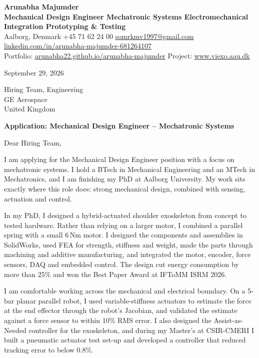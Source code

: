 \documentclass[10pt,a4paper]{article}
\begin{document}
{\LARGE\bfseries Arunabha Majumder}\\[2pt]
\textbf{Mechanical Design Engineer \textbar{} Mechatronic Systems \textbar{} Electromechanical Integration \textbar{} Prototyping \& Testing}\\[2pt]
{\small Aalborg, Denmark \textbar{} +45 71 62 24 00 \textbar{} \href{mailto:somrkmv1997@gmail.com}{somrkmv1997@gmail.com} \textbar{} \href{https://www.linkedin.com/in/arunabha-majumder-681264107}{linkedin.com/in/arunabha-majumder-681264107}\\
Portfolio: \href{https://arunabha22.github.io/arunabha-majumder/}{arunabha22.github.io/arunabha-majumder} \textbar{} Project: \href{https://www.viexo.aau.dk/}{www.viexo.aau.dk}}

September 29, 2026

Hiring Team, Engineering\\
GE Aerospace\\
United Kingdom

\textbf{Application: Mechanical Design Engineer -- Mechatronic Systems}

Dear Hiring Team,

I am applying for the Mechanical Design Engineer position with a focus on mechatronic systems. I hold a BTech in Mechanical Engineering and an MTech in Mechatronics, and I am finishing my PhD at Aalborg University. My work sits exactly where this role does: strong mechanical design, combined with sensing, actuation and control.

In my PhD, I designed a hybrid-actuated shoulder exoskeleton from concept to tested hardware. Rather than relying on a larger motor, I combined a parallel spring with a small 6\,Nm motor. I designed the components and assemblies in SolidWorks, used FEA for strength, stiffness and weight, made the parts through machining and additive manufacturing, and integrated the motor, encoder, force sensors, DAQ and embedded control. The design cut energy consumption by more than 25\% and won the Best Paper Award at IFToMM ISRM 2026.

I am comfortable working across the mechanical and electrical boundary. On a 5-bar planar parallel robot, I used variable-stiffness actuators to estimate the force at the end effector through the robot's Jacobian, and validated the estimate against a force sensor to within 10\% RMS error. I also designed the Assist-as-Needed controller for the exoskeleton, and during my Master's at CSIR-CMERI I built a pneumatic actuator test set-up and developed a controller that reduced tracking error to below 0.8\%.
\end{document}
